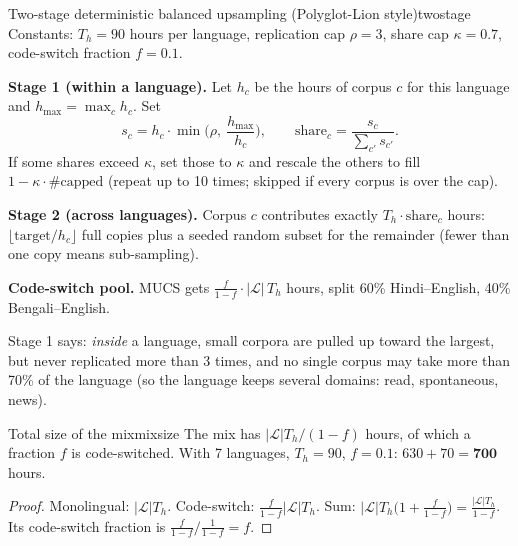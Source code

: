 \begin{definition}{Two-stage deterministic balanced upsampling (Polyglot-Lion style)}{twostage}
Constants: $T_h=90$ hours per language, replication cap $\rho=3$, share cap $\kappa=0.7$, code-switch fraction $f=0.1$.

\textbf{Stage 1 (within a language).} Let $h_c$ be the hours of corpus $c$ for this language and $h_{\max}=\max_c h_c$. Set
\[
s_c=h_c\cdot\min\!\Big(\rho,\ \frac{h_{\max}}{h_c}\Big),\qquad \text{share}_c=\frac{s_c}{\sum_{c'}s_{c'}}.
\]
If some shares exceed $\kappa$, set those to $\kappa$ and rescale the others to fill $1-\kappa\cdot\#\text{capped}$ (repeat up to 10
times; skipped if every corpus is over the cap).

\textbf{Stage 2 (across languages).} Corpus $c$ contributes exactly $T_h\cdot\text{share}_c$ hours: $\lfloor\text{target}/h_c\rfloor$
full copies plus a seeded random subset for the remainder (fewer than one copy means sub-sampling).

\textbf{Code-switch pool.} MUCS gets $\frac{f}{1-f}\cdot|\mathcal L|\,T_h$ hours, split 60\% Hindi--English, 40\% Bengali--English.
\end{definition}

Stage 1 says: \emph{inside} a language, small corpora are pulled up toward the largest, but never replicated more than 3 times, and
no single corpus may take more than 70\% of the language (so the language keeps several domains: read, spontaneous, news).

\begin{proposition}{Total size of the mix}{mixsize}
The mix has $|\mathcal L|T_h/(1-f)$ hours, of which a fraction $f$ is code-switched. With 7 languages, $T_h=90$, $f=0.1$:
$630+70=\mathbf{700}$ hours.
\end{proposition}
\begin{proof}
Monolingual: $|\mathcal L|T_h$. Code-switch: $\frac{f}{1-f}|\mathcal L|T_h$. Sum: $|\mathcal L|T_h\big(1+\frac{f}{1-f}\big)=
\frac{|\mathcal L|T_h}{1-f}$. Its code-switch fraction is $\frac{f}{1-f}\big/\frac{1}{1-f}=f$.
\end{proof}

